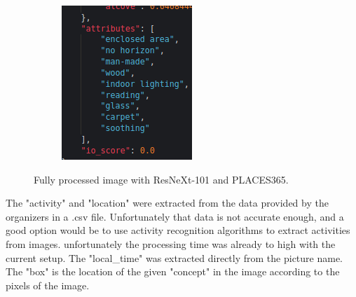 \begin{figure}[H]
\begin{subfigure}{0.3\textwidth}
      \end{subfigure}
      \begin{subfigure}{0.3\textwidth}
        \includegraphics[width=\textwidth]{Sections/4InitialWork/4_images_random/res3.png}
        \end{subfigure}
      \caption{Fully processed image with ResNeXt-101 and PLACES365.}
      \label{fig:image_fully_processed_resnext}
      \end{figure}


      The "activity" and "location" were extracted from the data provided by the organizers in a .csv file. Unfortunately that data is not accurate enough, and a good option would be to use activity recognition algorithms to extract activities from images. unfortunately the processing time was already to high with the current setup.
      The "local\_time" was extracted directly from the picture name.
      The "box" is the location of the given "concept" in the image according to the pixels of the image.


